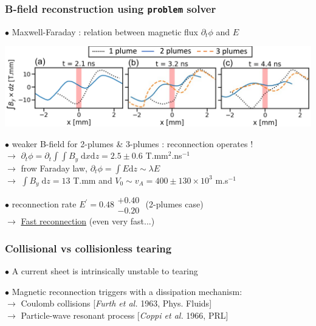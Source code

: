 \documentclass{beamer}
\newcommand{\D}{{\mathrm d}}
\begin{document}
\begin{frame}
\frametitle{B-field reconstruction using \texttt{problem} solver}

$\bullet$ Maxwell-Faraday : relation between magnetic flux $\partial_t \phi$ and $E$ \\

\begin{center}
\includegraphics[width=1.0\textwidth]{problem.png}
\end{center}

$\bullet$ weaker B-field for 2-plumes \& 3-plumes : reconnection operates ! \\
$\to$ $\partial_t \phi = \partial_t \int \!\!\! \int B_y \; \D x \D z = 2.5 \pm 0.6$ T.mm$^2$.ns$^{-1}$ \\
$\to$ frow Faraday law, $\partial_t \phi = \int E \D z \sim \lambda E$ \\
$\to$ $\int B_y \; \D z = 13$ T.mm and $V_0 \sim v_A = 400 \pm 130 \times 10^3$ m.s$^{-1}$ \\

\bigskip

$\bullet$ reconnection rate $E^{\prime} = 0.48 \substack{+0.40 \\ -0.20}$ (2-plumes case) \\
$\to$ \underline{Fast reconnection} (even very fast...) \\

\end{frame}



\begin{frame}
\frametitle{Collisional vs collisionless tearing}

$\bullet$ A current sheet is intrinsically unstable to tearing

\begin{center}

\end{center}

$\bullet$ Magnetic reconnection triggers with a dissipation mechanism: \\[0.4cm]
$\to$ Coulomb collisions [\textit{Furth et al.} 1963, Phys. Fluids] \\
$\to$ Particle-wave resonant process [\textit{Coppi et al.} 1966, PRL]


\end{frame}
\end{document}

